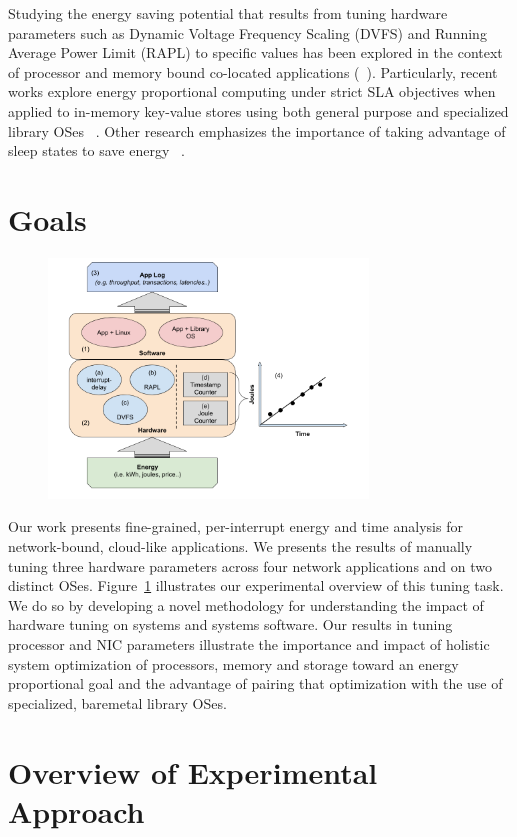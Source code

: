 \documentclass[pageno]{jpaper}
\begin{document}
Studying the energy saving potential that results from tuning hardware parameters such as Dynamic Voltage Frequency Scaling (DVFS) and Running Average Power Limit (RAPL) to specific values has been explored in the context of processor and memory bound co-located applications (~\cite{10.1145/3177754, zhang2015quantitative,10.1145/3302424.3303981}).
Particularly, recent works explore energy proportional computing under strict SLA objectives when applied to in-memory key-value stores using both general purpose and specialized library OSes ~\cite{10.1145/2678373.2665718, 10.1145/2806777.2806848, rubik, 10.1145/2806777.2806848}.
Other research emphasizes the importance of taking advantage of sleep states to save energy ~\cite{powernap,10.1145/3302424.3303981}.

\section{Goals}
\begin{figure}
  \includegraphics[width=8.5cm]{figures/setup.png}
  \caption{}
 \label{fig:setup}
\end{figure}
Our work presents fine-grained, per-interrupt energy and time analysis for network-bound, cloud-like applications. We presents the results of manually tuning three hardware parameters across four network applications and on two distinct OSes.
Figure~\ref{fig:setup} illustrates our experimental overview of this tuning task.
We do so by developing a novel methodology for understanding the impact of hardware tuning on systems and systems software.
Our results in tuning processor and NIC parameters illustrate the importance and impact of holistic system optimization of processors, memory and storage toward an energy proportional goal and the advantage of pairing that optimization with the use of specialized, baremetal library OSes.


\section{Overview of Experimental Approach}
\end{document}
